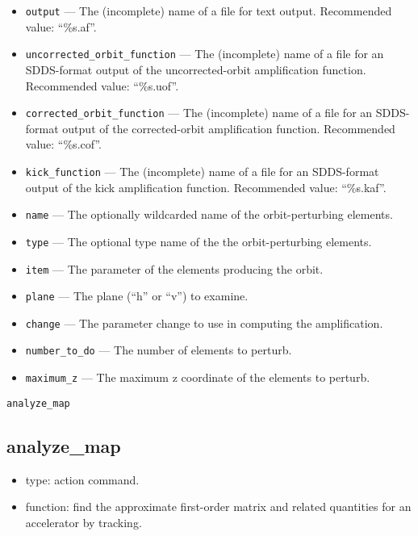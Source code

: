 \documentclass[11pt]{article}
\begin{document}
\begin{itemize}
\item \verb|output| ---  The (incomplete) name of a file for text output.   Recommended value: ``\%s.af''.
\item \verb|uncorrected_orbit_function| --- The (incomplete) name of a file for an SDDS-format output of the
    uncorrected-orbit amplification function.  Recommended value: ``\%s.uof''.
\item \verb|corrected_orbit_function| --- The (incomplete) name of a file for an SDDS-format output of the
    corrected-orbit amplification function.  Recommended value: ``\%s.cof''.
\item \verb|kick_function| --- The (incomplete) name of a file for an SDDS-format output of the kick amplification function.
Recommended value: ``\%s.kaf''.
\item \verb|name| --- The optionally wildcarded name of the orbit-perturbing elements.  
\item \verb|type| --- The optional type name of the the orbit-perturbing elements.
\item \verb|item| --- The parameter of the elements producing the orbit.
\item \verb|plane| --- The plane (``h'' or ``v'') to examine.
\item \verb|change| --- The parameter change to use in computing the amplification.  
\item \verb|number_to_do| --- The number of elements to perturb.
\item \verb|maximum_z| --- The maximum z coordinate of the elements to perturb.
\end{itemize}

\begin{latexonly}
\newpage
\begin{center}{\Large\verb|analyze_map|}\end{center}
\end{latexonly}
\subsection{analyze\_map \label{subsec:analyzemap}}

\begin{itemize}
\item type: action command.
\item function: find the approximate first-order matrix and related quantities for an accelerator by tracking.
\end{itemize}
\end{document}
